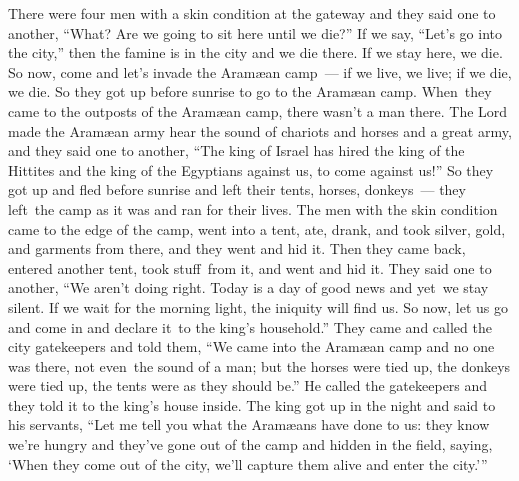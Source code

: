 \begin{inparaenum}
     There were four men with a skin condition at the gateway and they said one to another, ``What? Are we going to sit here until we die?''%
     If we say, ``Let's go into the city,'' then the famine is in the city and we die there. If we stay here, we die. So now, come and let's invade the Aram\ae{}an camp~--- if we live, we live; if we die, we die.%
     So they got up before sunrise to go to the Aram\ae{}an camp. When\understood\ they came to the outposts of the Aram\ae{}an camp, there wasn't a man there.%
     The Lord made the Aram\ae{}an army hear the sound of chariots and horses and a great army, and they said one to another, ``The king of Israel has hired the king of the Hittites and the king of the Egyptians against us, to come against us!''%
     So they got up and fled before sunrise and left their tents, horses, donkeys~--- they left\understood\ the camp as it was and ran for their lives.%
     The men with the skin condition came to the edge of the camp, went into a tent, ate, drank, and took silver, gold, and garments from there, and they went and hid it. Then they came back, entered another tent, took stuff\understood\ from it, and went and hid it.%
     They said one to another, ``We aren't doing right. Today is a day of good news and yet\understood\ we stay silent. If we wait for the morning light, the iniquity will find us. So now, let us go and come in and declare it\understood\ to the king's household.''%
     They came and called the city gatekeepers and told them, ``We came into the Aram\ae{}an camp and no one was there, not even\understood\ the sound of a man; but the horses were tied up, the donkeys were tied up, the tents were as they should be.''\thinspace\understood%
     He called the gatekeepers and they told it to the king's house inside.%
     The king got up in the night and said to his servants, ``Let me tell you what the Aram\ae{}ans have done to us: they know we're hungry and they've gone out of the camp and hidden in the field, saying, `When they come out of the city, we'll capture them alive and enter the city.'\thinspace''%

\end{inparaenum}
